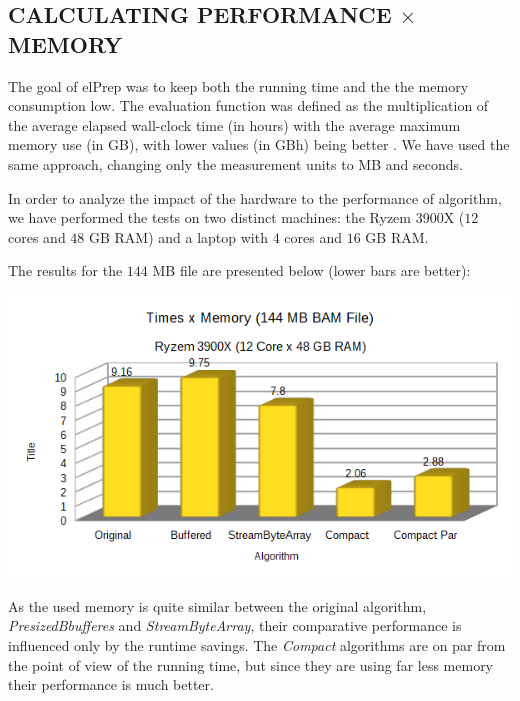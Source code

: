\documentclass[a4paper,twoside]{article}
\begin{document}




 
 
\subsection{\uppercase{Calculating performance $\times$ memory}} \label{subsec:uppercase7}
The goal of elPrep was to keep both the running time and the the memory consumption low. The evaluation function was defined as the multiplication of the average elapsed wall-clock time (in hours) with the average maximum memory use (in GB), with lower values (in GBh) being better \cite{costanza:2019}.
We have used the same approach, changing only the measurement units to MB and seconds.

In order to analyze the impact of the hardware to the performance of algorithm, we have performed the tests on two distinct machines: the Ryzem 3900X ($1$2 cores and $48$ GB RAM) and a laptop with $4$ cores and $16$ GB RAM.

The results for the $144$ MB file are presented below (lower bars are better):
\begin{center}
	\includegraphics[scale=0.5]{images/times_and_memory_chart_small_144mb_ryzen.png}
\end{center}

As the used memory is quite similar between the original algorithm, {\it PresizedBbufferes} and {\it StreamByteArray}, their comparative performance is influenced only by the runtime savings. 
The {\it Compact} algorithms are on par from the point of view of the running time, but since they are using far less memory their performance is much better.
\end{document}
